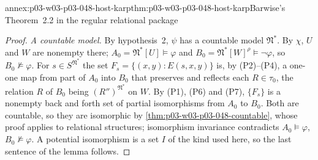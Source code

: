 \begin{annexitem}{annex:p03-w03-p03-048-host-karp}{thm:p03-w03-p03-048-host-karp}{Barwise's Theorem~2.2 in the regular relational package}
\begin{proof}
\emph{A countable model.}  By hypothesis~2, \(\psi\) has a countable model
\(\mathfrak N^{\ast}\).  By \(\chi\), \(U\) and \(W\) are nonempty there;
\(A_0=\mathfrak N^{\ast}[U]\models\varphi\) and \(B_0=\mathfrak
N^{\ast}[W]^{\rho}\models\neg\varphi\), so \(B_0\not\models\varphi\).  For
\(s\in S^{\mathfrak N^{\ast}}\) the set \(F_s=\{(x,y):E(s,x,y)\}\) is, by
(P2)--(P4), a one-one map from part of \(A_0\) into \(B_0\) that preserves and
reflects each \(R\in\tau_0\), the relation \(R\) of \(B_0\) being
\((R'')^{\mathfrak N^{\ast}}\) on \(W\).  By (P1), (P6) and (P7),
\(\{F_s\}\) is a nonempty back and forth set of partial isomorphisms from
\(A_0\) to \(B_0\).  Both are countable, so they are isomorphic by
\cref{thm:p03-w03-p03-048-countable}, whose proof applies to relational
structures; isomorphism invariance contradicts \(A_0\models\varphi\),
\(B_0\not\models\varphi\).  A potential isomorphism is a set \(I\) of the
kind used here, so the last sentence of the lemma follows.
\end{proof}
\end{annexitem}

